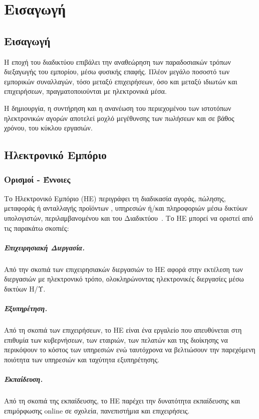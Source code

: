 \documentclass[12pt]{report}
\begin{document}
\hypersetup{pageanchor=true}
\clearpage
{}

\chapter{Εισαγωγή}\label{ch1}
\section{Εισαγωγή}
Η εποχή του διαδικτύου επιβάλει την αναθεώρηση των παραδοσιακών τρόπων διεξαγωγής του εμπορίου, μέσω φυσικής επαφής. Πλέον μεγάλο ποσοστό των εμπορικών συναλλαγών, τόσο μεταξύ επιχειρήσεων, όσο και μεταξύ ιδιωτών και επιχειρήσεων, πραγματοποιούνται με ηλεκτρονικά μέσα.

Η δημιουργία, η συντήρηση και η ανανέωση του περιεχομένου των ιστοτόπων ηλεκτρονικών αγορών αποτελεί μοχλό μεγέθυνσης των πωλήσεων και σε βάθος χρόνου, του κύκλου εργασιών.

\section{Ηλεκτρονικό Εμπόριο}
\subsection{Ορισμοί - Έννοιες}
Το Ηλεκτρονικό Εμπόριο (ΗΕ) περιγράφει τη διαδικασία αγοράς, πώλησης, μεταφοράς ή ανταλλαγής προϊόντων , υπηρεσιών ή/και πληροφοριών μέσω δικτύων υπολογιστών, περιλαμβανομένου και του Διαδικτύου~\cite{turban_outland_king_lee_liang_turban_2018}. Το ΗΕ μπορεί να οριστεί από τις παρακάτω σκοπιές:
  \paragraph{Επιχειρησιακή Διεργασία.} Από την σκοπιά των επιχειρησιακών διεργασιών το ΗΕ αφορά στην εκτέλεση των διεργασιών με ηλεκτρονικό τρόπο, ολοκληρώνοντας ηλεκτρονικές διεργασίες μέσω δικτύων Η/Υ.
  \paragraph{Εξυπηρέτηση.} Από τη σκοπιά των επιχειρήσεων, το ΗΕ είναι ένα εργαλείο που απευθύνεται στη επιθυμία των κυβερνήσεων, των εταιριών, των πελατών και της διοίκησης να περικόψουν το κόστος των υπηρεσιών ενώ ταυτόχρονα να βελτιώσουν την παρεχόμενη ποιότητα των υπηρεσιών και ταχύτητα εξυπηρέτησης.
  \paragraph{Εκπαίδευση.} Από τη σκοπιά της εκπαίδευσης, το ΗΕ παρέχει την δυνατότητα εκπαίδευσης και επιμόρφωσης \textlatin{online} σε σχολεία, πανεπιστήμια και επιχειρήσεις.
\end{document}
